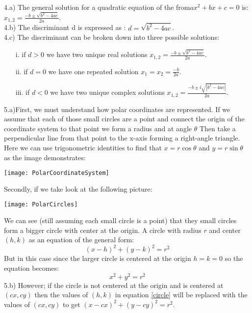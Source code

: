\documentclass[letterpaper, 24pt, final, onecolumn, titlepage] {article}
\begin{document}
4.a) The general solution for a quadratic equation of the from$ax^2 + bx + c = 0$ is: $x_{1,2} = \frac{-b \pm \sqrt{b^2-4ac}}{2a}$.\\
\pagebreak
4.b) The discriminant d  is expressed as : $d = \sqrt{b^2-4ac}$.\\
4.c) The discriminant can be broken down into three possible solutions:
\begin{enumerate}
\item[i.] if $d>0$ we have two unique real solutions $x_{1,2} = \frac{-b \pm \sqrt{b^2-4ac}}{2a}$.
\item[ii.] if $d=0$ we have one repeated solution $x_1 = x_2 = \frac{-b}{2a}$.
\item[iii.] if $d<0$ we have two unique complex solutions $x_{1,2} = \frac{-b \pm i\sqrt{|b^2-4ac|}}{2a}$.\\
\end{enumerate}
5.a)First, we must understand how polar coordinates are represented. If we assume that each of those small circles are a point and connect the origin of the coordinate system to that point we form a radius and at angle $\theta$
Then take a perpendicular line from that point to the x-axis forming a right-angle triangle. Here we can use trigonometric identities to find that $x = r\cos\theta$ and $y = r\sin\theta$ as the image demonstrates:
\begin{center}\texttt{[image: PolarCoordinateSystem]} \end{center}
\pagebreak
Secondly, if we take look at the following picture:
\begin{center}\texttt{[image: PolarCircles]} \end{center}
We can see (still assuming each small circle is a point) that they small circles form a bigger circle with center at the origin.
A circle with radius $r$ and center$(h, k)$ as an equation of the general form:
\begin{equation}\label{circle}
(x-h)^2 + (y-k)^2 = r^2
\end{equation}
But in this case since the larger circle is centered at the origin $h = k = 0$ so the equation becomes:
\begin{equation} \label{circleOrigin}
x^2 + y^2 = r^2
\end{equation}
5.b) However; if the circle is not centered at the origin and is centered at $(cx, cy)$ then the values of $(h,k)$ in equation \ref{circle} will be replaced with the values of $(cx, cy)$ to get $(x-cx)^2 + (y-cy)^2 = r^2$.\\\\
\end{document}

